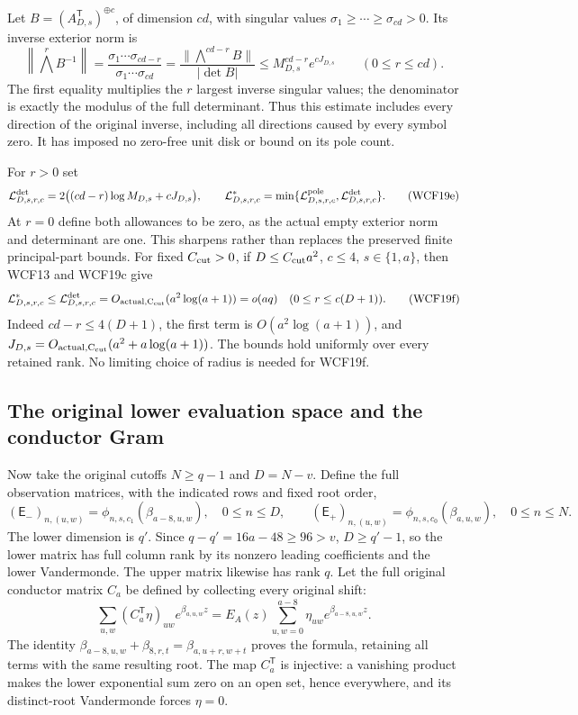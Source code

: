 \documentclass[11pt,a4paper]{article}
\begin{document}
Let $B=(A_{D,s}^{\mathsf T})^{\oplus c}$, of dimension $cd$, with
singular values $\sigma_1\ge\cdots\ge\sigma_{cd}>0$. Its inverse
exterior norm is
\[
 \left\|\bigwedge^rB^{-1}\right\|
 =\frac{\sigma_1\cdots\sigma_{cd-r}}
           {\sigma_1\cdots\sigma_{cd}}
 =\frac{\|\bigwedge^{cd-r}B\|}{|\det B|}
 \le M_{D,s}^{cd-r}e^{cJ_{D,s}}\qquad(0\le r\le cd).
 \tag{WCF19d}
\]
The first equality multiplies the $r$ largest inverse singular values;
the denominator is exactly the modulus of the full determinant. Thus
this estimate includes every direction of the original inverse, including
all directions caused by every symbol zero. It has imposed no zero-free
unit disk or bound on its pole count.

For $r>0$ set
\[
 \mathcal L^{\rm det}_{D,s,r,c}
 =2\bigl((cd-r)\log M_{D,s}+cJ_{D,s}\bigr),\qquad
 \mathcal L^*_{D,s,r,c}
 =\min\{\mathcal L^{\rm pole}_{D,s,r,c},
                         \mathcal L^{\rm det}_{D,s,r,c}\}.
 \tag{WCF19e}
\]
At $r=0$ define both allowances to be zero, as the actual empty
exterior norm and determinant are one. This sharpens rather than
replaces the preserved finite principal-part bounds. For fixed $C_{\rm cut}>0$, if
$D\le C_{\rm cut}a^2$, $c\le4$, $s\in\{1,a\}$, then WCF13 and WCF19c give
\[
 \mathcal L^*_{D,s,r,c}
 \le\mathcal L^{\rm det}_{D,s,r,c}
 =O_{\rm actual,C_{\rm cut}}(a^2\log(a+1))=o(aq)
 \quad(0\le r\le c(D+1)).
 \tag{WCF19f}
\]
Indeed $cd-r\le4(D+1)$, the first term is
$O(a^2\log(a+1))$, and $J_{D,s}=O_{\rm actual,C_{\rm cut}}(a^2+
a\log(a+1))$. The bounds hold uniformly over every retained rank.
No limiting choice of radius is needed for WCF19f.

\subsection{The original lower evaluation space and the conductor Gram}

Now take the original cutoffs $N\ge q-1$ and $D=N-v$. Define
the full observation matrices, with the indicated rows and fixed root order,
\[
 (\mathsf E_-)_{n,(u,w)}=\phi_{n,s,c_1}(\beta_{a-8,u,w}),\quad0\le n\le D,
 \qquad
 (\mathsf E_+)_{n,(u,w)}=\phi_{n,s,c_0}(\beta_{a,u,w}),\quad0\le n\le N.
 \tag{WCF20}
\]
The lower dimension is $q'$. Since $q-q'=16a-48\ge96>v$,
$D\ge q'-1$, so the lower matrix has full column rank by its
nonzero leading coefficients and the lower Vandermonde. The upper
matrix likewise has rank $q$. Let the full original conductor matrix
$C_a$ be defined by collecting every original shift:
\[
 \sum_{u,w}(C_a^{\mathsf T}\eta)_{uw}e^{\beta_{a,u,w}z}
       =E_A(z)\sum_{u,w=0}^{a-8}\eta_{uw}e^{\beta_{a-8,u,w}z}.
 \tag{WCF21}
\]
The identity $\beta_{a-8,u,w}+\beta_{8,r,t}=\beta_{a,u+r,w+t}$
proves the formula, retaining all terms with the same resulting root.
The map $C_a^{\mathsf T}$ is injective: a vanishing product makes
the lower exponential sum zero on an open set, hence everywhere,
and its distinct-root Vandermonde forces $\eta=0$.
\end{document}
